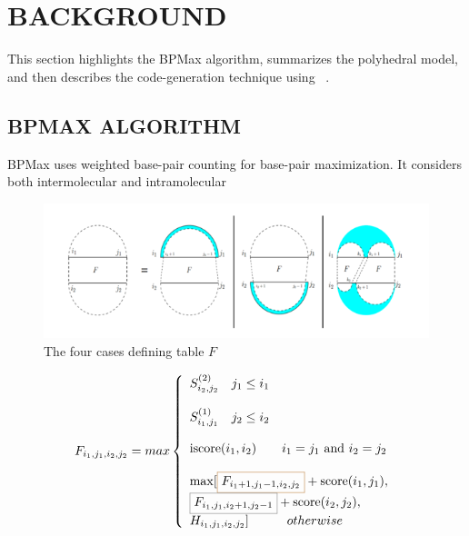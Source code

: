 \section{\uppercase{Background}}
This section highlights the BPMax algorithm, summarizes the polyhedral model, and then describes the code-generation technique using \alphaz\ .

\subsection{\uppercase{BPMax ALGORITHM}}
BPMax uses weighted base-pair counting for base-pair maximization. It considers  both intermolecular and intramolecular
\begin{figure}[htbp]
\centerline{\includegraphics[scale=.9]{bpmax.png}}
\caption{The four cases defining table $F$}
\label{fig:bpm_eddy_rivas}
\end{figure}
\begin{equation}
\label{eqn:bpm_recurrence}
F_{i_{1},j_{1}, i_{2}, j_{2}}  =max \left \{\begin{array}{lr}
                 S_{i_{2}, j_{2}}^{(2)}   \hspace{10pt} j_{1}\le i_{1} \\
                 \\
                 S_{i_{1}, j_{1}}^{(1)}   \hspace{10pt} j_{2}\le i_{2} \\
                 \\
                 \text{iscore}(i_{1}, i_{2})   \hspace{20pt}  i_{1} = j_{1} \text{ and }  i_{2} = j_{2} \\
                 \\
                 \max[ \colorboxed{brown}{F_{i_{1}+1, j_{1}-1, i_{2}, j_{2}}} + \text{score}(i_{1}, j_{1}), \\
                      \colorboxed{gray}{F_{i_{1}, j_{1}, i_{2}+1, j_{2}-1}} + \text{score}(i_{2}, j_{2}), \\
                      H_{i_{1},j_{1},i_{2},j_{2}}]   \hspace{30pt}  otherwise
               \end{array}
           \right. \\
\end{equation}
